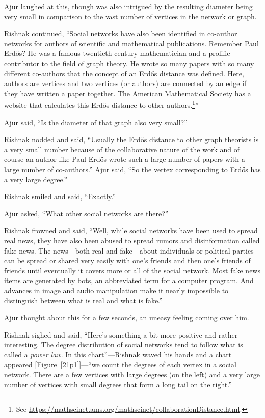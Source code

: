 Ajur laughed at this, though was also intrigued by the resulting diameter being very small in comparison to the vast number of vertices in the network or graph.

Rishnak continued, ``Social networks have also been identified in co-author networks for authors of scientific and mathematical publications. Remember Paul Erd\H{o}s? He was a famous twentieth century mathematician and a prolific contributor to the field of graph theory. He wrote so many papers with so many different co-authors that the concept of an Erd\H{o}s distance was defined. Here, authors are vertices and two vertices (or authors) are connected by an edge if they have written a paper together. The American Mathematical Society has a website that calculates this Erd\H{o}s distance to other authors.\footnote{See \url{https://mathscinet.ams.org/mathscinet/collaborationDistance.html}.}''

Ajur said, ``Is the diameter of that graph also very small?''

Rishnak nodded and said, ``Usually the Erd\H{o}s distance to other graph theorists is a very small number because of the collaborative nature of the work and of course an author like Paul Erd\H{o}s wrote such a large number of papers with a large number of co-authors.''
 
Ajur said, ``So the vertex corresponding to Erd\H{o}s has a very large degree.''

Rishnak smiled and said, ``Exactly.''

Ajur asked, ``What other social networks are there?''

Rishnak frowned and said, ``Well, while social networks have been used to spread real news, they have also been abused to spread rumors and disinformation called fake news. The news---both real and fake---about individuals or political parties can be spread or shared very easily with one's friends and then one's friends of friends until eventually it covers more or all of the social network. Most fake news items are generated by bots, an abbreviated term for a computer program. And advances in image and audio manipulation make it nearly impossible to distinguish between what is real and what is fake.''

Ajur thought about this for a few seconds, an uneasy feeling coming over him.

Rishnak sighed and said, ``Here's something a bit more positive and rather interesting. The degree distribution of social networks tend to follow what is called a \textit{power law}. In this chart''---Rishnak waved his hands and a chart appeared [Figure~\ref{21p1}]---``we count the degrees of each vertex in a social network. There are a few vertices with large degrees (on the left) and a very large number of vertices with small degrees that form a long tail on the right.''

